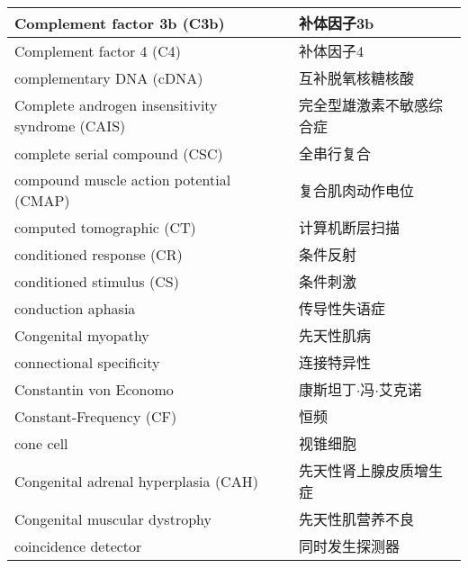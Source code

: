 \begin{longtable}{lll}
	\midrule
	Complement factor 3b (C3b)  && 补体因子3b  \\
	
	\midrule
	Complement factor 4 (C4)  && 补体因子4  \\
	
	\midrule
	complementary DNA (cDNA)   && 互补脱氧核糖核酸  \\
	
	\midrule
	\makecell[l]{Complete androgen insensitivity\\ syndrome (CAIS)}  && 完全型雄激素不敏感综合症  \\
	
	\midrule
	complete serial compound (CSC) && 全串行复合  \\
	
	\midrule
	compound muscle action potential (CMAP) && 复合肌肉动作电位  \\
	
	\midrule
	computed tomographic (CT)   && 计算机断层扫描  \\
	
	\midrule
	conditioned response (CR)    &&  条件反射  \\
	
	\midrule
	conditioned stimulus (CS)     &&  条件刺激  \\
	
	\midrule
	conduction aphasia    &&  传导性失语症  \\
	
	\midrule
	Congenital myopathy     &&  先天性肌病  \\
	
	\midrule
	connectional specificity     &&  连接特异性  \\
	
	\midrule
	Constantin von Economo    &&  康斯坦丁$\cdot$冯$\cdot$艾克诺  \\
	
	\midrule
	Constant-Frequency (CF)     &&  恒频  \\
	
	\midrule
	cone cell      && 视锥细胞  \\
	
	\midrule
	Congenital adrenal hyperplasia (CAH)  && 先天性肾上腺皮质增生症  \\
	
	\midrule
	Congenital muscular dystrophy  && 先天性肌营养不良  \\
	
	\midrule
	coincidence detector  && 同时发生探测器  \\
	

\end{longtable}
